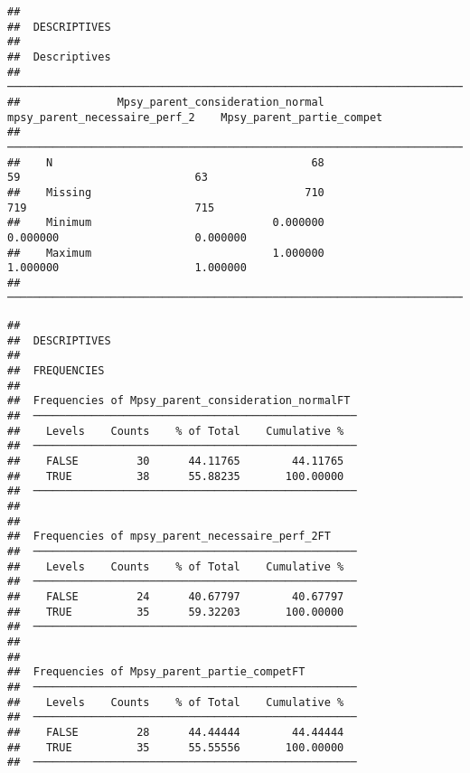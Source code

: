 \documentclass[
]{article}
\begin{document}
\begin{verbatim}
## 
##  DESCRIPTIVES
## 
##  Descriptives                                                                                                  
##  ───────────────────────────────────────────────────────────────────────────────────────────────────────────── 
##               Mpsy_parent_consideration_normal    mpsy_parent_necessaire_perf_2    Mpsy_parent_partie_compet   
##  ───────────────────────────────────────────────────────────────────────────────────────────────────────────── 
##    N                                        68                               59                           63   
##    Missing                                 710                              719                          715   
##    Minimum                            0.000000                         0.000000                     0.000000   
##    Maximum                            1.000000                         1.000000                     1.000000   
##  ─────────────────────────────────────────────────────────────────────────────────────────────────────────────
\end{verbatim}

\begin{verbatim}
## 
##  DESCRIPTIVES
## 
##  FREQUENCIES
## 
##  Frequencies of Mpsy_parent_consideration_normalFT  
##  ────────────────────────────────────────────────── 
##    Levels    Counts    % of Total    Cumulative %   
##  ────────────────────────────────────────────────── 
##    FALSE         30      44.11765        44.11765   
##    TRUE          38      55.88235       100.00000   
##  ────────────────────────────────────────────────── 
## 
## 
##  Frequencies of mpsy_parent_necessaire_perf_2FT     
##  ────────────────────────────────────────────────── 
##    Levels    Counts    % of Total    Cumulative %   
##  ────────────────────────────────────────────────── 
##    FALSE         24      40.67797        40.67797   
##    TRUE          35      59.32203       100.00000   
##  ────────────────────────────────────────────────── 
## 
## 
##  Frequencies of Mpsy_parent_partie_competFT         
##  ────────────────────────────────────────────────── 
##    Levels    Counts    % of Total    Cumulative %   
##  ────────────────────────────────────────────────── 
##    FALSE         28      44.44444        44.44444   
##    TRUE          35      55.55556       100.00000   
##  ──────────────────────────────────────────────────
\end{verbatim}
\end{document}
